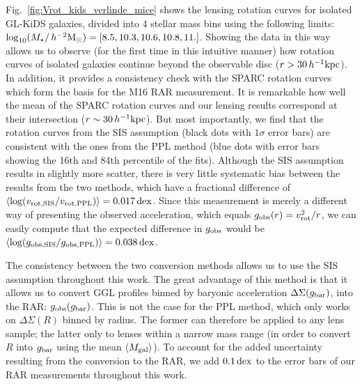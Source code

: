 \documentclass[usenatbib]{mnras}
\newcommand{\hmsun}{\,h^{-2} {\rm M_\odot}}
\newcommand{\hkpc}{\, h^{-1}{\rm{kpc}} }
\newcommand*{\meanb}[1]{\langle{#1}\rangle}
\newcommand{\un}[1]{_{\rm #1}}
\newcommand{\dex}{\, {\rm dex}}
\begin{document}
Fig.~\ref{fig:Vrot_kids_verlinde_mice} shows the lensing rotation curves for isolated GL-KiDS galaxies, divided into 4 stellar mass bins using the following limits: $\log_{10}(M_\star/\hmsun) = [8.5,10.3,10.6,10.8,11.]$. Showing the data in this way allows us to observe (for the first time in this intuitive manner) how rotation curves of isolated galaxies continue beyond the observable disc ($r>30\hkpc$). In addition, it provides a consistency check with the SPARC rotation curves \cite[]{lelli2016b} which form the basis for the M16 RAR measurement. It is remarkable how well the mean of the SPARC rotation curves and our lensing results correspond at their intersection ($r\sim 30 \hkpc$). But most importantly, we find that the rotation curves from the SIS assumption (black dots with $1\sigma$ error bars) are consistent with the ones from the PPL method (blue dots with error bars showing the 16th and 84th percentile of the fits). Although the SIS assumption results in slightly more scatter, there is very little systematic bias between the results from the two methods, which have a fractional difference of $\meanb{\log(v\un{rot, SIS} / v\un{rot, PPL})} = 0.017 \dex$. Since this measurement is merely a different way of presenting the observed acceleration, which equals $g\un{obs}(r) = v\un{rot}^2 / r$, we can easily compute that the expected difference in $g\un{obs}$ would be $\meanb{\log(g\un{obs, SIS} / g\un{obs, PPL})} = 0.038 \dex$.

The consistency between the two conversion methods allows us to use the SIS assumption throughout this work. The great advantage of this method is that it allows us to convert GGL profiles binned by baryonic acceleration $\Delta\Sigma(g\un{bar})$, into the RAR: $g\un{obs}(g\un{bar})$. This is not the case for the PPL method, which only works on $\Delta\Sigma(R)$ binned by radius. The former can therefore be applied to any lens sample; the latter only to lenses within a narrow mass range (in order to convert $R$ into $g\un{bar}$ using the mean $\meanb{M\un{gal}}$). To account for the added uncertainty resulting from the conversion to the RAR, we add $0.1 \dex$ to the error bars of our RAR measurements throughout this work.
\end{document}
